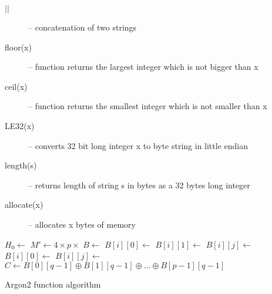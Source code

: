 \documentclass[nolof]{fithesis3}
\begin{document}
\begin{description}
\item[\(||\)] -- concatenation of two strings

\item[floor(x)] -- function returns the largest integer which is not bigger than x

\item[ceil(x)] -- function returns the smallest integer which is not smaller than x

\item[LE32(x)] -- converts 32 bit long integer x to byte string in little endian

\item[length(s)] -- returns length of string s in bytes as a 32 bytes long integer

\item[allocate(x)] -- allocates x bytes of memory
\end{description}

\begin{algorithm}
\DontPrintSemicolon
\LinesNumbered
{}
\(H_0 \leftarrow \)  \;
\(M' \leftarrow 4 \times p \times \)  \;
\(B \leftarrow \)  \;
 {
\(B[i][0] \leftarrow \)  \;
}
 {
\(B[i][1] \leftarrow \)  \;
}
 {
 {
\(B[i][j] \leftarrow \)  \;
}
}
 {
 {
\(B[i][0] \leftarrow \)  \;
 {
\(B[i][j] \leftarrow \)  \;
}
}
}
\(C \leftarrow B[0][q-1] \oplus B[1][q-1] \oplus \dots \oplus B[p-1][q-1]\) \;
\caption{Argon2 function algorithm}
\label{argon2alg}
\end{algorithm}
\end{document}
